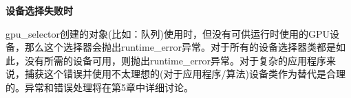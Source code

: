 \hspace*{\fill} \par %
\textbf{设备选择失败时}

gpu\_selector创建的对象(比如：队列)使用时，但没有可供运行时使用的GPU设备，那么这个选择器会抛出runtime\_error异常。对于所有的设备选择器类都是如此，没有所需的设备可用，则抛出runtime\_error异常。对于复杂的应用程序来说，捕获这个错误并使用不太理想的(对于应用程序/算法)设备类作为替代是合理的。异常和错误处理将在第5章中详细讨论。\par





